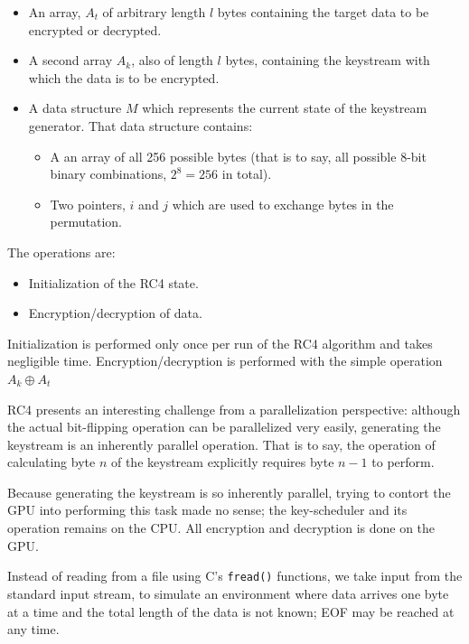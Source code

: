 \documentclass[twocolumn]{article}
\begin{document}
  \begin{itemize}
    \item An array, $A_t$ of arbitrary length $l$  bytes containing the target data to be encrypted or decrypted.
    \item A second array $A_k$, also of length $l$ bytes, containing the keystream with which the data is to be encrypted.
    \item A data structure $M$ which represents the current state of the keystream generator. That data structure contains:
    \begin{itemize}
      \item A an array of all 256 possible bytes (that is to say, all possible 8-bit binary combinations, $2^8=256$ in total).
      \item Two pointers, $i$ and $j$ which are used to exchange bytes in the permutation.
    \end{itemize}
  \end{itemize}
  
  The operations are:
  
  \begin{itemize}
    \item Initialization of the RC4 state.
    \item Encryption/decryption of data.
  \end{itemize}
  
  Initialization is performed only once per run of the RC4 algorithm and takes negligible time. Encryption/decryption is performed with the simple operation $A_k \oplus A_t$
  
  RC4 presents an interesting challenge from a parallelization perspective: although the actual bit-flipping operation can be parallelized very easily, generating the keystream is an inherently parallel operation. That is to say, the operation of calculating byte $n$ of the keystream explicitly requires byte $n-1$ to perform.
  
  Because generating the keystream is so inherently parallel, trying to contort the GPU into performing this task made no sense; the key-scheduler and its operation remains on the CPU. All encryption and decryption is done on the GPU.
  
  Instead of reading from a file using C's \texttt{fread()} functions, we take input from the standard input stream, to simulate an environment where data arrives one byte at a time and the total length of the data is not known; EOF may be reached at any time.
    
\end{document}
